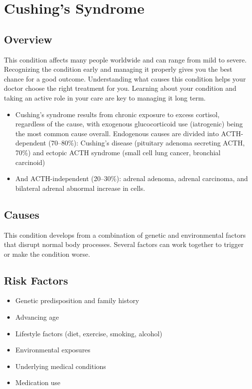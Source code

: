 \chapter{Cushing's Syndrome}
\label{sec:Cushing's Syndrome}

\section{Overview}
This condition affects many people worldwide and can range from mild to severe. Recognizing the condition early and managing it properly gives you the best chance for a good outcome. Understanding what causes this condition helps your doctor choose the right treatment for you. Learning about your condition and taking an active role in your care are key to managing it long term.

\begin{itemize}[noitemsep]
  \item Cushing's syndrome results from chronic exposure to excess cortisol, regardless of the cause, with exogenous glucocorticoid use (iatrogenic) being the most common cause overall. Endogenous causes are divided into ACTH-dependent (70--80\%): Cushing's disease (pituitary adenoma secreting ACTH, 70\%) and ectopic ACTH syndrome (small cell lung cancer, bronchial carcinoid)
  \item And ACTH-independent (20--30\%): adrenal adenoma, adrenal carcinoma, and bilateral adrenal abnormal increase in cells.
\end{itemize}

\section{Causes}
This condition develops from a combination of genetic and environmental factors that disrupt normal body processes. Several factors can work together to trigger or make the condition worse.

\section{Risk Factors}

\begin{itemize}[noitemsep]
  \item Genetic predisposition and family history
  \item Advancing age
  \item Lifestyle factors (diet, exercise, smoking, alcohol)
  \item Environmental exposures
  \item Underlying medical conditions
  \item Medication use
\end{itemize}

